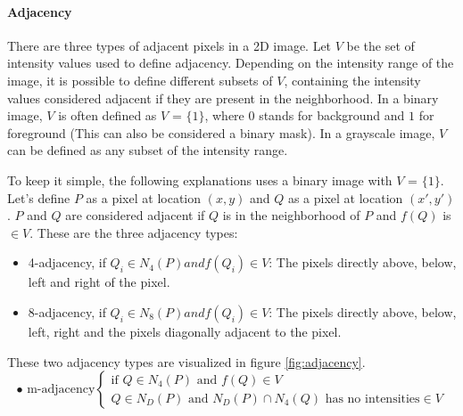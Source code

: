 \paragraph*{Adjacency} There are three types of adjacent pixels in a 2D image. Let $V$ be the set of intensity values used to define adjacency. Depending on the intensity range of the image, it is possible to define different subsets of $V$, containing the intensity values considered adjacent if they are present in the neighborhood. In a binary image, $V$ is often defined as $V$ = $\{1\}$, where $0$ stands for background and $1$ for foreground (This can also be considered a binary mask). In a grayscale image, $V$ can be defined as any subset of the intensity range.

To keep it simple, the following explanations uses a binary image with $V$ = $\{1\}$. Let's define $P$ as a pixel at location $(x,y)$ and $Q$ as a pixel at location $(x',y')$. $P$ and $Q$ are considered adjacent if $Q$ is in the neighborhood of $P$ and $f(Q)$ is $\in V$. These are the three adjacency types:

\begin{itemize}
    \item 4-adjacency, if $Q_i \in N_4(P) and f(Q_i) \in  V$: The pixels directly above, below, left and right of the pixel. 
    \item 8-adjacency, if $Q_i \in N_8(P) and f(Q_i) \in  V$: The pixels directly above, below, left, right and the pixels diagonally adjacent to the pixel.
\end{itemize}
These two adjacency types are visualized in figure \ref{fig:adjacency}.
\begin{equation*}
    \bullet \text{ m-adjacency} \begin{cases}
   \text{if } Q \in N_4(P) \text{ and } f(Q) \in  V \\
    Q \in N_D(P) \text{ and } N_D(P)  \cap N_4(Q) \text{ has no intensities} \in  V
    \end{cases}
    \end{equation*}


